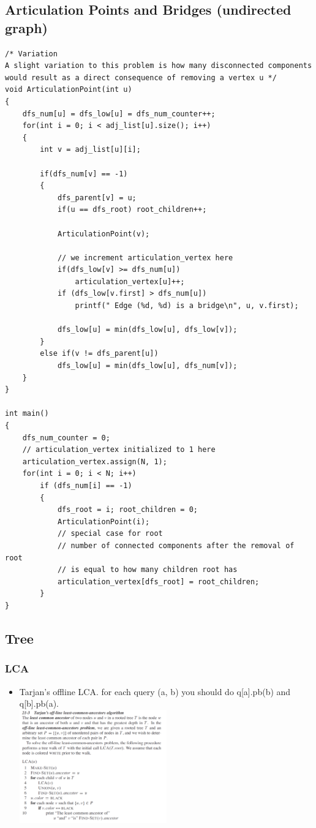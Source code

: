 \documentclass[8pt, a4paper, oneside, twocolumn]{extarticle}
\begin{document}
\subsection{Articulation Points and Bridges (undirected graph)}
\begin{verbatim}
/* Variation
A slight variation to this problem is how many disconnected components would result as a direct consequence of removing a vertex u */
void ArticulationPoint(int u)
{
    dfs_num[u] = dfs_low[u] = dfs_num_counter++;
    for(int i = 0; i < adj_list[u].size(); i++)
    {
        int v = adj_list[u][i];
        
        if(dfs_num[v] == -1)
        {
            dfs_parent[v] = u;
            if(u == dfs_root) root_children++;

            ArticulationPoint(v);
            
            // we increment articulation_vertex here
            if(dfs_low[v] >= dfs_num[u])
                articulation_vertex[u]++;
            if (dfs_low[v.first] > dfs_num[u])
                printf(" Edge (%d, %d) is a bridge\n", u, v.first);
                
            dfs_low[u] = min(dfs_low[u], dfs_low[v]);
        }
        else if(v != dfs_parent[u])
            dfs_low[u] = min(dfs_low[u], dfs_num[v]);
    }
}

int main() 
{
    dfs_num_counter = 0;
    // articulation_vertex initialized to 1 here
    articulation_vertex.assign(N, 1);
    for(int i = 0; i < N; i++)
        if (dfs_num[i] == -1)
        {
            dfs_root = i; root_children = 0;
            ArticulationPoint(i);
            // special case for root
            // number of connected components after the removal of root
            // is equal to how many children root has
            articulation_vertex[dfs_root] = root_children;
        }
}
\end{verbatim}
\subsection{Tree}
\subsubsection{LCA}
\begin{itemize}
    \item Tarjan's offline LCA. for each query (a, b) you should do q[a].pb(b) and q[b].pb(a).
\\\includegraphics[width=0.5\textwidth,height=0.5\textheight,keepaspectratio]{tar}
\end{itemize}
\end{document}
